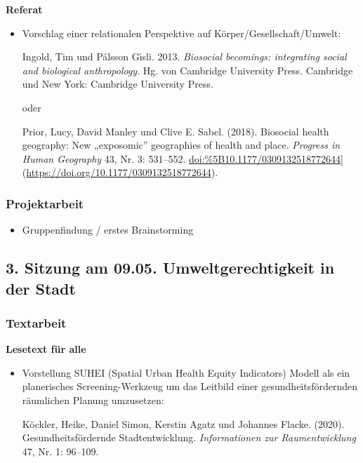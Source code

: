 \documentclass[
  ngerman,
]{article}
\providecommand{\tightlist}{%
  \setlength{\itemsep}{0pt}\setlength{\parskip}{0pt}}
\begin{document}
\textbf{Referat}

\begin{itemize}
\item
  Vorschlag einer relationalen Perspektive auf Körper/Gesellschaft/Umwelt:

  Ingold, Tim und Pálsson Gı́sli. 2013. \emph{Biosocial becomings: integrating social and biological anthropology}. Hg. von Cambridge University Press. Cambridge und New York: Cambridge University Press.

  oder

  Prior, Lucy, David Manley und Clive E. Sabel. (2018). Biosocial health geography: New „exposomic'' geographies of health and place. \emph{Progress in Human Geography} 43, Nr. 3: 531--552. \url{doi:\%5B10.1177/0309132518772644}{]}(\url{https://doi.org/10.1177/0309132518772644}).
\end{itemize}

\hypertarget{projektarbeit}{%
\subsubsection*{Projektarbeit}\label{projektarbeit}}

\begin{itemize}
\tightlist
\item
  Gruppenfindung / erstes Brainstorming
\end{itemize}

\hypertarget{sitzung-am-09.05.-umweltgerechtigkeit-in-der-stadt}{%
\subsection*{3. Sitzung am 09.05. \textbar{} Umweltgerechtigkeit in der Stadt}\label{sitzung-am-09.05.-umweltgerechtigkeit-in-der-stadt}}

\hypertarget{textarbeit-2}{%
\subsubsection*{Textarbeit}\label{textarbeit-2}}

\textbf{Lesetext für alle}

\begin{itemize}
\item
  Vorstellung SUHEI (Spatial Urban Health Equity Indicators) Modell als ein planerisches Screening-Werkzeug um das Leitbild einer gesundheitsfördernden räumlichen Planung umzusetzen:

  Köckler, Heike, Daniel Simon, Kerstin Agatz und Johannes Flacke. (2020). Gesundheitsfördernde Stadtentwicklung. \emph{Informationen zur Raumentwicklung} 47, Nr. 1: 96--109.
\end{itemize}
\end{document}
